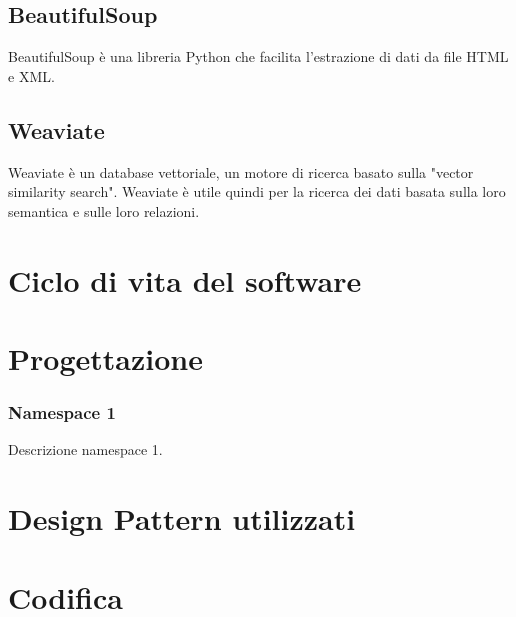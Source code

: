 \subsection{BeautifulSoup}
BeautifulSoup è una libreria Python che facilita l'estrazione di dati da file HTML e XML.
\subsection{Weaviate}
Weaviate è un database vettoriale, un motore di ricerca basato sulla "vector similarity search".
Weaviate è utile quindi per la ricerca dei dati basata sulla loro semantica e sulle loro relazioni. 

\section{Ciclo di vita del software}
\label{sec:ciclo-vita-software}

\section{Progettazione}
\label{sec:progettazione}

\subsubsection{Namespace 1} %
Descrizione namespace 1.

\begin{namespacedesc}
\end{namespacedesc}


\section{Design Pattern utilizzati}

\section{Codifica}
